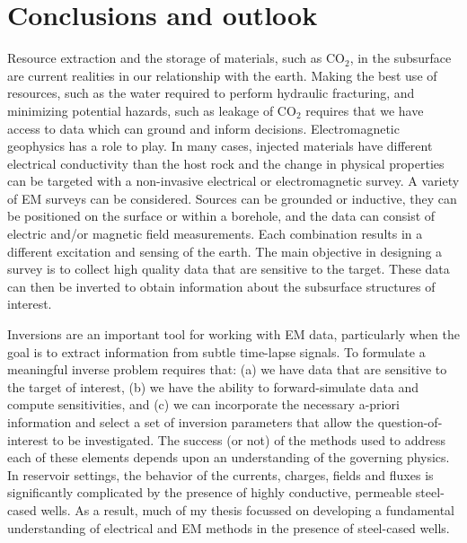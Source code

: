 \chapter{Conclusions and outlook}
\label{ch:conclusion}

Resource extraction and the storage of materials, such as CO$_2$, in the subsurface are current realities in our relationship with the earth. Making the best use of resources, such as the water required to perform hydraulic fracturing, and minimizing potential hazards, such as leakage of CO$_2$ requires that we have access to data which can ground and inform decisions. Electromagnetic geophysics has a role to play. In many cases, injected materials have different electrical conductivity than the host rock and the change in physical properties can be targeted with a non-invasive electrical or electromagnetic survey. A variety of EM surveys can be considered. Sources can be grounded or inductive, they can be positioned on the surface or within a borehole, and the data can consist of electric and/or magnetic field measurements. Each combination results in a different excitation and sensing of the earth. The main objective in designing a survey is to collect high quality data that are sensitive to the target. These data can then be inverted to obtain information about the subsurface structures of interest.

Inversions are an important tool for working with EM data, particularly when the goal is to extract information from subtle time-lapse signals. To formulate a meaningful inverse problem requires that: (a) we have data that are sensitive to the target of interest, (b) we have the ability to forward-simulate data and compute sensitivities, and (c) we can incorporate the necessary a-priori information and select a set of inversion parameters that allow the question-of-interest to be investigated. The success (or not) of the methods used to address each of these elements depends upon an understanding of the governing physics. In reservoir settings, the behavior of the currents, charges, fields and fluxes is significantly complicated by the presence of highly conductive, permeable steel-cased wells. As a result, much of my thesis focussed on developing a fundamental understanding of electrical and EM methods in the presence of steel-cased wells.

